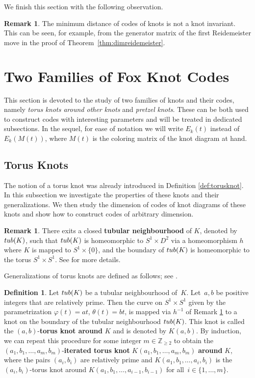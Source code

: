 \documentclass[11pt,a4paper]{article}
\theoremstyle{definition}
\newtheorem{definition}[theorem]{Definition}
\newtheorem{remark}[theorem]{Remark}
\newcommand{\numberset}{\mathbb}
\newcommand{\Z}{\numberset{Z}}
\newcommand{\tub}{\textnormal{tub}}
\begin{document}
We finish this section with the following observation.


\begin{remark}
\label{rem:minimumdist}
The minimum distance of codes of knots is not a knot invariant. This can be seen, for example, from the generator matrix of the first Reidemeister move in the proof of Theorem~\ref{thm:dimreidemeister}.
\end{remark}


\section{Two Families of Fox Knot Codes}
\label{sec:families}
\label{sec:4}

This section is devoted to the study of two families of knots and their codes, namely \textit{torus knots around other knots} and \textit{pretzel knots}.
These can be both used to construct codes with 
interesting parameters and will be treated in dedicated subsections. In the sequel, for ease of notation we will write
$E_k(t)$
instead of
$E_k(M(t))$,
where $M(t)$ is the coloring matrix of the knot diagram at hand.


\subsection{Torus Knots}
\label{subsec:torus}
The notion of a torus knot was already introduced in Definition \ref{def:torusknot}. In this subsection we investigate the properties of these knots and their generalizations. We then study the dimension of codes of knot diagrams of these knots and show how to construct codes of arbitrary dimension.

\begin{remark}\label{tubular-nbhd}
There exits a closed \textbf{tubular neighbourhood} of $K$, denoted by $\tub(K)$, 
such that $\tub(K)$ is homeomorphic to $S^1\times D^2$ via a homeomorphism $h$ where $K$ is mapped to $S^1\times \{0\}$,
and the boundary of $\tub(K)$ is homeomorphic to the torus $S^1\times S^1$. See \cite{hirsch1968} for more details.
\end{remark}

Generalizations of torus knots are defined as follows; see \cite{burau1934knots,le1972knots}.

\begin{definition}
\label{def:cableknot}
Let $\tub(K)$ be a {tubular neighbourhood} of~$K$.
Let~$a,b$ be positive integers that are relatively prime.
Then the curve on $S^1\times S^1$ given by the parametrization $\varphi (t)=at$, $\theta (t)=bt$, is mapped via $h^{-1}$ of Remark \ref{tubular-nbhd} to a knot on the
boundary of the tubular neighbourhood $\tub(K)$. 
This knot is called the $(a,b)$-\textbf{torus knot around} $K$ and is denoted by $K(a,b)$. 
By induction, we can repeat this procedure for some integer $m \in \Z_{\ge 2}$ to obtain the $(a_1,b_1,\ldots ,a_m,b_m)$-\textbf{iterated torus knot} $K(a_1,b_1,\ldots ,a_m,b_m)$ \textbf{around} $K$, where
the pairs $(a_i,b_i)$ are relatively prime  and $K(a_1,b_1,\ldots ,a_i,b_i)$ is the $(a_i,b_i)$-torus knot around
$K(a_1,b_1,\ldots ,a_{i-1}, b_{i-1})$ for all~$i \in \{1,\ldots,m\}$. 
\end{definition}
\end{document}
